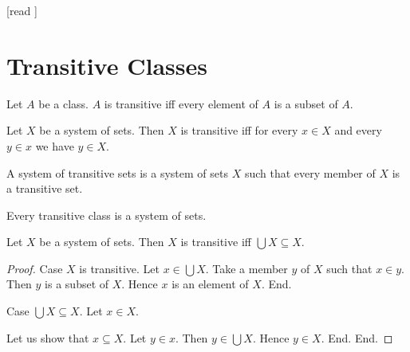 \documentclass[10pt]{article}
\begin{document}
  \begin{imports}
    \begin{forthel}
      [read ]
    \end{forthel}
  \end{imports}


  \section*{Transitive Classes}

  \begin{forthel}
    \begin{definition}[id=SET_THEORY_01_8167915266244608,printid]
      Let $A$ be a class.
      $A$ is transitive iff every element of $A$ is a subset of $A$.
    \end{definition}
  \end{forthel}

  \begin{forthel}
    \begin{proposition}[id=SET_THEORY_01_6964770955591680,printid]
      Let $X$ be a system of sets.
      Then $X$ is transitive iff for every $x \in X$ and every $y \in x$ we have $y \in X$.
    \end{proposition}
  \end{forthel}

  \begin{forthel}
    \begin{definition}[id=SET_THEORY_01_4219967964708864,printid]
      A system of transitive sets is a system of sets $X$ such that every member of $X$ is a transitive set.
    \end{definition}
  \end{forthel}

  \begin{forthel}
    \begin{proposition}[id=SET_THEORY_01_2095807333400576,printid]
      Every transitive class is a system of sets.
    \end{proposition}
  \end{forthel}

  \begin{forthel}
    \begin{proposition}[id=SET_THEORY_01_6524117649981440,printid]
      Let $X$ be a system of sets.
      Then $X$ is transitive iff $\bigcup X \subseteq X$.
    \end{proposition}
    \begin{proof}
      Case $X$ is transitive.
        Let $x \in \bigcup X$.
        Take a member $y$ of $X$ such that $x \in y$.
        Then $y$ is a subset of $X$.
        Hence $x$ is an element of $X$.
      End.

      Case $\bigcup X \subseteq X$.
        Let $x \in X$.

        Let us show that $x \subseteq X$.
          Let $y \in x$.
          Then $y \in \bigcup X$.
          Hence $y \in X$.
        End.
      End.
    \end{proof}
  \end{forthel}
\end{document}
